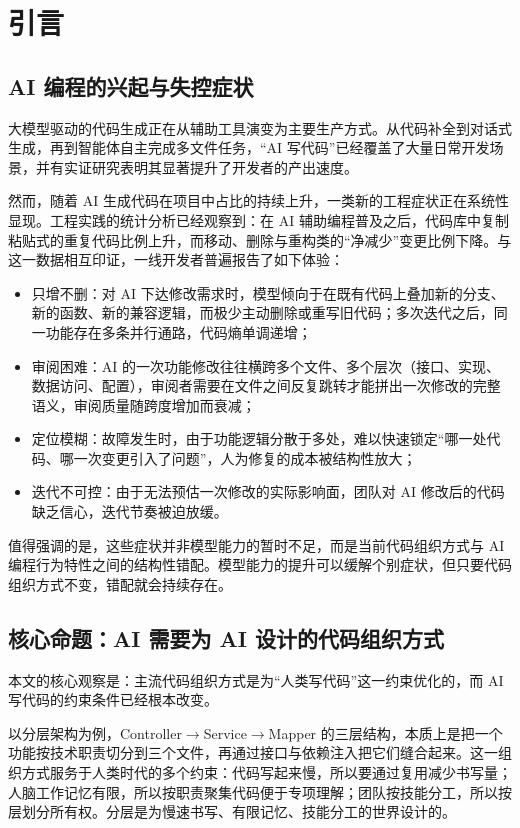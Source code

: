 \documentclass[11pt,a4paper]{ctexart}
\begin{document}
\clearpage

\section{引言}
\subsection{AI 编程的兴起与失控症状}
大模型驱动的代码生成正在从辅助工具演变为主要生产方式。从代码补全到对话式生成，再到智能体自主完成多文件任务，“AI 写代码”已经覆盖了大量日常开发场景，并有实证研究表明其显著提升了开发者的产出速度\cite{ref1}。

然而，随着 AI 生成代码在项目中占比的持续上升，一类新的工程症状正在系统性显现。工程实践的统计分析已经观察到：在 AI 辅助编程普及之后，代码库中复制粘贴式的重复代码比例上升，而移动、删除与重构类的“净减少”变更比例下降\cite{ref2}。与这一数据相互印证，一线开发者普遍报告了如下体验：

\begin{itemize}
\item 只增不删：对 AI 下达修改需求时，模型倾向于在既有代码上叠加新的分支、新的函数、新的兼容逻辑，而极少主动删除或重写旧代码；多次迭代之后，同一功能存在多条并行通路，代码熵单调递增；
\item 审阅困难：AI 的一次功能修改往往横跨多个文件、多个层次（接口、实现、数据访问、配置），审阅者需要在文件之间反复跳转才能拼出一次修改的完整语义，审阅质量随跨度增加而衰减；
\item 定位模糊：故障发生时，由于功能逻辑分散于多处，难以快速锁定“哪一处代码、哪一次变更引入了问题”，人为修复的成本被结构性放大；
\item 迭代不可控：由于无法预估一次修改的实际影响面，团队对 AI 修改后的代码缺乏信心，迭代节奏被迫放缓。
\end{itemize}

值得强调的是，这些症状并非模型能力的暂时不足，而是当前代码组织方式与 AI 编程行为特性之间的结构性错配。模型能力的提升可以缓解个别症状，但只要代码组织方式不变，错配就会持续存在。

\subsection{核心命题：AI 需要为 AI 设计的代码组织方式}
本文的核心观察是：主流代码组织方式是为“人类写代码”这一约束优化的，而 AI 写代码的约束条件已经根本改变。

以分层架构为例，Controller$\rightarrow$Service$\rightarrow$Mapper 的三层结构，本质上是把一个功能按技术职责切分到三个文件，再通过接口与依赖注入把它们缝合起来。这一组织方式服务于人类时代的多个约束：代码写起来慢，所以要通过复用减少书写量；人脑工作记忆有限，所以按职责聚集代码便于专项理解；团队按技能分工，所以按层划分所有权。分层是为慢速书写、有限记忆、技能分工的世界设计的。
\end{document}
